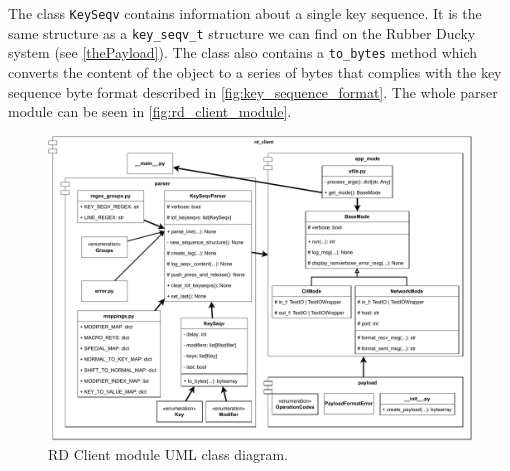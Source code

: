 The class \verb|KeySeqv| contains information about a single key sequence. It is the same structure as a \verb|key_seqv_t| structure we can find on the Rubber Ducky system (see \autoref{thePayload}). The class also contains a \verb|to_bytes| method which converts the content of the object to a series of bytes that complies with the key sequence byte format described in \autoref{fig:key_sequence_format}. The whole parser module can be seen in \autoref{fig:rd_client_module}.
\begin{figure}[ht]
    \centering
    \includegraphics[width=\linewidth]{./obrazky-figures/rd_client_module.pdf}
    \caption{RD Client module UML class diagram.}
    \label{fig:rd_client_module}
\end{figure}

